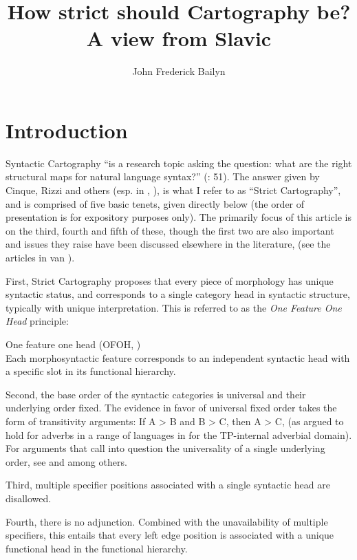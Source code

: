 \documentclass[output=paper]{langscibook}
\author{John Frederick Bailyn\affiliation{Stony Brook University}\orcid{}}
\title{How strict should Cartography be? A view from Slavic}
\begin{document}
\maketitle

\section{Introduction}
Syntactic Cartography “is a research topic asking the question: what are the right structural maps for natural language syntax?” (\citealt{CinqueRizzi2010}: 51). The answer given by Cinque, Rizzi and others (esp. in \citealt{cinque1999}, \citealt{CinqueRizzi2010, rizzicinque2016}), is what I refer to as “Strict Cartography”, and is comprised of five basic tenets, given directly below (the order of presentation is for expository purposes only). The primarily focus of this article is on the third, fourth and fifth of these, though the first two are also important and issues they raise have been discussed elsewhere in the literature, (see the articles in van \citealt{Craenenbroeck2009}). 

First, Strict Cartography proposes that every piece of morphology has unique syntactic status, and corresponds to a single category head in syntactic structure, typically with unique interpretation. This is referred to as the \textit{One Feature One Head} principle: 


\begin{exe}
\ex \label{bai1}One feature one head (OFOH, \citealt[52]{CinqueRizzi2010}) \\
Each morphosyntactic feature corresponds to an independent  syntactic head with a specific slot in its functional hierarchy.
\end{exe}

Second, the base order of the syntactic categories is universal and their underlying order fixed. The evidence in favor of universal fixed order takes the form of transitivity arguments: If A > B and B > C, then A > C, (as argued to hold for adverbs in a range of languages in \citealt{cinque1999} for the TP-internal adverbial domain). For arguments that call into question the universality of a single underlying order, see \citealt{Bobaljik1999} and \citealt{Nilsen2003} among others. 

Third, multiple specifier positions associated with a single syntactic head are disallowed. 

Fourth, there is no adjunction. Combined with the unavailability of multiple specifiers, this entails that every left edge position is associated with a unique functional head in the functional hierarchy. 
\end{document}

